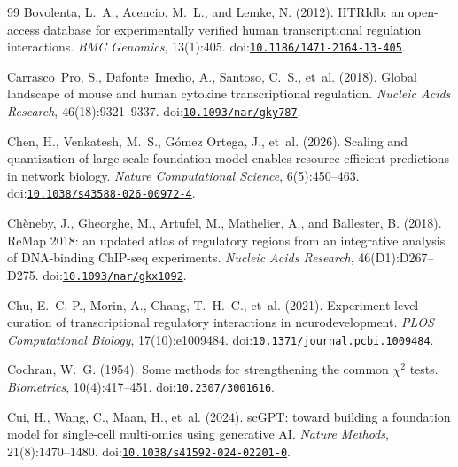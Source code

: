 \documentclass[11pt,a4paper]{article}
\begin{document}
\begin{thebibliography}{99}
Bovolenta, L.~A., Acencio, M.~L., and Lemke, N. (2012).
\newblock HTRIdb: an open-access database for experimentally verified human transcriptional regulation interactions.
\newblock \emph{BMC Genomics}, 13(1):405.
\newblock doi:\href{https://doi.org/10.1186/1471-2164-13-405}{\nolinkurl{10.1186/1471-2164-13-405}}.

Carrasco Pro, S., Dafonte Imedio, A., Santoso, C.~S., et~al. (2018).
\newblock Global landscape of mouse and human cytokine transcriptional regulation.
\newblock \emph{Nucleic Acids Research}, 46(18):9321--9337.
\newblock doi:\href{https://doi.org/10.1093/nar/gky787}{\nolinkurl{10.1093/nar/gky787}}.

Chen, H., Venkatesh, M.~S., G{\'o}mez Ortega, J., et~al. (2026).
\newblock Scaling and quantization of large-scale foundation model enables resource-efficient predictions in network biology.
\newblock \emph{Nature Computational Science}, 6(5):450--463.
\newblock doi:\href{https://doi.org/10.1038/s43588-026-00972-4}{\nolinkurl{10.1038/s43588-026-00972-4}}.

Ch{\`e}neby, J., Gheorghe, M., Artufel, M., Mathelier, A., and Ballester, B. (2018).
\newblock ReMap 2018: an updated atlas of regulatory regions from an integrative analysis of DNA-binding ChIP-seq experiments.
\newblock \emph{Nucleic Acids Research}, 46(D1):D267--D275.
\newblock doi:\href{https://doi.org/10.1093/nar/gkx1092}{\nolinkurl{10.1093/nar/gkx1092}}.

Chu, E.~C.-P., Morin, A., Chang, T.~H.~C., et~al. (2021).
\newblock Experiment level curation of transcriptional regulatory interactions in neurodevelopment.
\newblock \emph{PLOS Computational Biology}, 17(10):e1009484.
\newblock doi:\href{https://doi.org/10.1371/journal.pcbi.1009484}{\nolinkurl{10.1371/journal.pcbi.1009484}}.

Cochran, W.~G. (1954).
\newblock Some methods for strengthening the common $\chi^2$ tests.
\newblock \emph{Biometrics}, 10(4):417--451.
\newblock doi:\href{https://doi.org/10.2307/3001616}{\nolinkurl{10.2307/3001616}}.

Cui, H., Wang, C., Maan, H., et~al. (2024).
\newblock sc{GPT}: toward building a foundation model for single-cell multi-omics using generative {AI}.
\newblock \emph{Nature Methods}, 21(8):1470--1480.
\newblock doi:\href{https://doi.org/10.1038/s41592-024-02201-0}{\nolinkurl{10.1038/s41592-024-02201-0}}.


\end{thebibliography}
\end{document}

